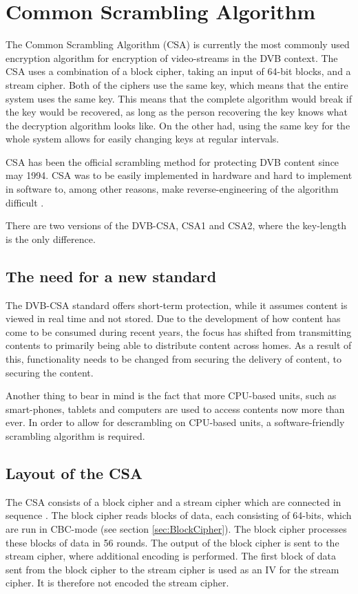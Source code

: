 \chapter{Common Scrambling Algorithm} \label{ch:CSA}
The Common Scrambling Algorithm (CSA) is currently the most commonly 
used encryption algorithm for encryption of video-streams in the DVB 
context. The CSA uses a combination of a block cipher, taking an input 
of 64-bit blocks, and a stream cipher. Both of the ciphers use the 
same key, which means that the entire system uses the same key. This 
means that the complete algorithm would break if the key would be 
recovered, as long as the person recovering the key knows what the 
decryption algorithm looks like. On the other had, using the same key 
for the whole system allows for easily changing keys at regular 
intervals. \citep[pp. 271--272]{WeiLi:2007}

CSA has been the official scrambling method for protecting DVB content 
since may 1994. CSA was to be easily implemented in hardware and hard 
to implement in software to, among other reasons, make 
reverse-engineering of the algorithm difficult \citep{DVBScene:2013}.

There are two versions of the DVB-CSA, CSA1 and CSA2, where the 
key-length is the only difference.
\citep[p. 23]{DVBScene:2013}

\section{The need for a new standard}
The DVB-CSA standard offers short-term protection, while it assumes 
content is viewed in real time and not stored. Due to the development 
of how content has come to be consumed during recent years, the focus 
has shifted from transmitting contents to primarily being able to 
distribute content across homes. As a result of this, functionality 
needs to be changed from securing the delivery of content, to securing 
the content. \citep{Farncombe}

Another thing to bear in mind is the fact that more CPU-based units, 
such as smart-phones, tablets and computers are used to access contents 
now more than ever. In order to allow for descrambling on CPU-based 
units, a software-friendly scrambling algorithm is required.

\section{Layout of the CSA}
The CSA consists of a block cipher and a stream cipher which are 
connected in sequence \citep[p. 271]{WeiLi:2007}. The block cipher 
reads blocks of data, each consisting of 64-bits, which are run in 
CBC-mode (see section \ref{sec:BlockCipher}). The block cipher 
processes these blocks of data in 56 rounds. The output of the block 
cipher is sent to the stream cipher, where additional encoding is 
performed. The first block of data sent from the block cipher to the 
stream cipher is used as an IV for the stream cipher. It is therefore
not encoded the stream cipher. \citep{DVBAnalysis:2006}

